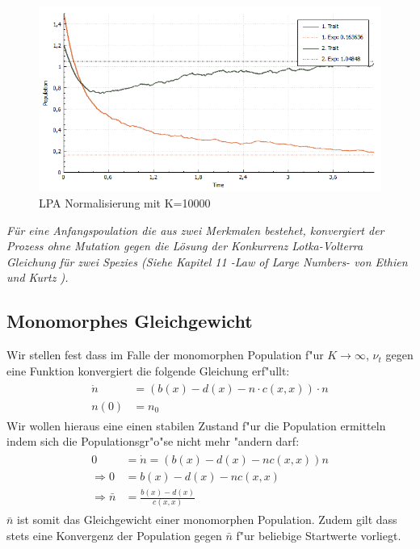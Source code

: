 \documentclass[11pt, a4paper, german]{article}
\begin{document}
	\begin{figure}[H]
		\centering
		\includegraphics[width=0.7\linewidth]{./Pictures/LPANormalisierungK10000}
		\caption[LPAK100]{LPA Normalisierung mit K=10000}
		\label{LPA Normalisierung K=10000}
	\end{figure}
	\textit{Für eine Anfangspoulation die aus zwei Merkmalen bestehet, konvergiert der Prozess ohne Mutation gegen die Lösung der Konkurrenz Lotka-Volterra Gleichung für zwei Spezies (Siehe Kapitel 11 -Law of Large Numbers- von Ethien und Kurtz \cite{ethier2009markov}).}
	
	\subsection{Monomorphes Gleichgewicht}
	Wir stellen fest dass im Falle der monomorphen Population f"ur $ K \to \infty $, $ \nu_t $ gegen eine Funktion konvergiert die folgende Gleichung erf"ullt:
	\begin{align}
	\begin{split}
		\dot{n} &= (b(x) - d(x) - n \cdot c(x,x)) \cdot n \\
		n(0) &= n_0
	\end{split}
	\end{align}
	Wir wollen hieraus eine einen stabilen Zustand f"ur die Population ermitteln indem sich die Populationsgr"o"se nicht mehr "andern darf:
	\begin{align}
	\begin{split}
		0 &= \dot{n} = (b(x) - d(x) - nc(x,x))n\\
		\Rightarrow 0 &= b(x) - d(x) - nc(x,x)\\
		\Rightarrow \bar{n} &= \frac{b(x) - d(x)}{c(x,x)}
	\end{split}
	\end{align}
	$ \bar{n} $ ist somit das Gleichgewicht einer monomorphen Population. Zudem gilt dass stets eine Konvergenz der Population gegen $ \bar{n} $ f"ur beliebige Startwerte vorliegt.
	
	
\end{document}
